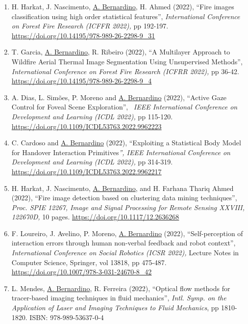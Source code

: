 \documentclass[
]{article}
\begin{document}
\begin{enumerate}
  A. John, J. van Opstal, \ul{A. Bernardino} (2023), ``A Cable-Driven
  Robotic Eye for Understanding Eye-Movement Control'',
  \emph{International Conference on Automation, Robotics and
  Applications (ICARA 2023)}, pp 128-133.
  \url{https://doi.org/10.1109/ICARA56516.2023.10126021}
\item
  H. Harkat, J. Nascimento, \ul{A. Bernardino}, H. Ahmed (2022), ``Fire
  images classification using high order statistical features'',
  \emph{International Conference on Forest Fire Research (ICFFR 2022),}
  pp 192-197. \url{https://doi.org/10.14195/978-989-26-2298-9_31}~
\item
  T. Garcia, \ul{A. Bernardino}, R. Ribeiro (2022), ``A Multilayer
  Approach to Wildfire Aerial Thermal Image Segmentation Using
  Unsupervised Methods'', \emph{International Conference on Forest Fire
  Research (ICFRR 2022),} pp 36-42.
  \url{https://doi.org/10.14195/978-989-26-2298-9_4}~
\item
  A. Dias, L. Simões, P. Moreno and \ul{A. Bernardino} (2022), ``Active
  Gaze Control for Foveal Scene Exploration'',~ \emph{IEEE International
  Conference on Development and Learning (ICDL 2022),} pp 115-120.
  \url{https://doi.org/10.1109/ICDL53763.2022.9962223}~
\item
  C. Cardoso and \ul{A. Bernardino} (2022), ``Exploiting a Statistical
  Body Model for Handover Interaction Primitives\emph{'', IEEE
  International Conference on Development and Learning (ICDL 2022),} pp
  314-319. \url{https://doi.org/10.1109/ICDL53763.2022.9962217}~
\item
  H. Harkat, J. Nascimento, \ul{A. Bernardino}, and H. Farhana Thariq
  Ahmed (2022), ``Fire image detection based on clustering data mining
  techniques'', \emph{Proc. SPIE 12267, Image and Signal Processing for
  Remote Sensing XXVIII, 122670D,} 10 pages.
  \url{https://doi.org/10.1117/12.2636268}~
\item
  F. Loureiro, J. Avelino, P. Moreno, \ul{A. Bernardino} (2022),
  ``Self-perception of interaction errors through human non-verbal
  feedback and robot context'', \emph{International Conference on Social
  Robotics (ICSR 2022),} Lecture Notes in Computer Science, Springer,
  vol 13818, pp 475-487.
  \url{https://doi.org/10.1007/978-3-031-24670-8_42}
\item
  L. Mendes, \ul{A. Bernardino}, R. Ferreira (2022), ``Optical flow
  methods for tracer-based imaging techniques in fluid mechanics'',
  \emph{Intl. Symp. on the Application of Laser and Imaging Techniques
  to Fluid Mechanics}, pp 1810-1820. ISBN: 978-989-53637-0-4

\end{enumerate}
\end{document}
